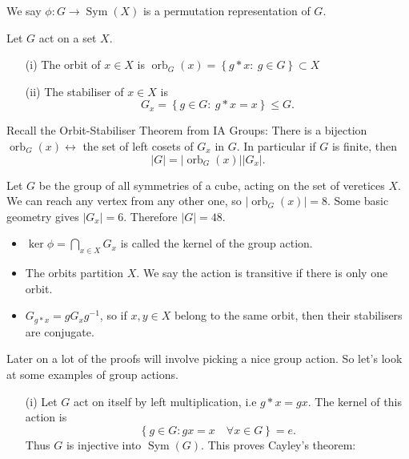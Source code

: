 \documentclass[egregdoesnotlikesansseriftitles,a4paper]{scrartcl}
\begin{document}
\begin{definition*}
      We say $\phi: G \rightarrow \operatorname{Sym}(X)$ is a permutation representation of $G$.
\end{definition*}
\begin{definition*}
     Let $G$ act on a set $X$. 
     \begin{itemize}
          \item[(i)] The orbit of $x \in X$ is $\operatorname{orb}_G (x)=\left\{g \ast x: \ g \in G\right\} \subset X$
          \item[(ii)] The stabiliser of $x \in X$ is \[
          G_{x}=\left\{g \in G: \ g \ast x=x\right\} \leq G
          .\] 
     \end{itemize}
\end{definition*}
Recall the Orbit-Stabiliser Theorem from IA Groups: There is a bijection $\operatorname{orb}_G (x) \leftrightarrow $ the set of left cosets of $G_{x}$ in $G$. In particular if $G$ is finite, then \[
|G|=|\operatorname{orb}_G (x)| |G_{x}|
.\] 
\begin{example*}
      Let $G$ be the group of all symmetries of a cube, acting on the set of veretices $X$. We can reach any vertex from any other one, so $|\operatorname{orb}_G (x)|=8$. Some basic geometry gives $|G_{x}|=6$. Therefore $|G|=48$.
\end{example*} 
\begin{remark}
      \begin{itemize}
           \item $\operatorname{ker} \phi=\bigcap_{x \in X}G_{x}$ is called the kernel of the group action. 
           \item The orbits partition $X$. We say the action is transitive if there is only one orbit.
           \item $G_{g \ast x}=g G_{x} {g}^{-1}$, so if $x,y \in X$ belong to the same orbit, then their stabilisers are conjugate.
      \end{itemize}
\end{remark}
Later on a lot of the proofs will involve picking a nice group action. So let's look at some examples of group actions. 
\begin{itemize}
     \item[(i)] Let $G$ act on itself by left multiplication, i.e $g \ast x =gx$. The kernel of this action is \[
     \left\{g \in G: gx=x \quad \forall x \in G\right\}=e
     .\] Thus $G $ is injective into $\operatorname{Sym}(G)$. This proves Cayley's theorem:
 \end{itemize}
\end{document}
